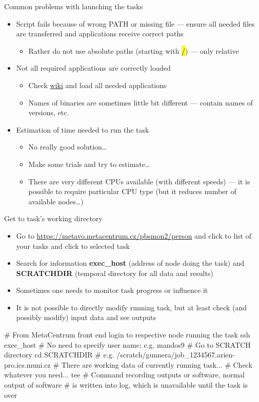 \documentclass[compress, ucs, xelatex, 11pt, xcolor=svgnames, aspectratio=169,
	hyperref={
		bookmarks=true,
		unicode=true,
		colorlinks=true,
		pdftitle={Linux, command line and MetaCentrum},
		plainpages=false,
		pdfauthor={Vojtech Zeisek},
		pdfsubject={Course about use of Linux command line, writing shell scripts and using MetaCentrum of CESNET},
		pdfcreator={XeLaTeX},
		pdfkeywords={Linux, GNU, BASH, shell, command line, MetaCentrum},
		linkcolor=DarkRed, %
		anchorcolor=DarkBlue, %
		citecolor=Indigo, %
		filecolor=NavyBlue, %
		menucolor=DarkMagenta, %
		urlcolor=DarkBlue, %
		pdftex},
	url={hyphens, lowtilde} %
	]{beamer}
\renewcommand{\texttt}[1]{\hl{\ttfamily #1}}
\begin{document}
\begin{frame}{Common problems with launching the tasks}
	\begin{itemize}
		\item Script fails because of wrong PATH or missing file --- ensure all needed files are transferred and applications receive correct paths
		\begin{itemize}
			\item Rather do not use absolute paths (starting with \texttt{/}) --- only relative
		\end{itemize}
		\item Not all required applications are correctly loaded
		\begin{itemize}
			\item Check \href{https://wiki.metacentrum.cz/wiki/Kategorie:Applications}{wiki} and load all needed applications
			\item Names of binaries are sometimes little bit different --- contain names of versions, etc.
		\end{itemize}
		\item Estimation of time needed to run the task
		\begin{itemize}
			\item No really good solution\ldots
			\item Make some trials and try to estimate\ldots
			\item There are very different CPUs available (with different speeds) --- it is possible to require particular CPU type (but it reduces number of available nodes\ldots)
		\end{itemize}
	\end{itemize}
\end{frame}

\begin{frame}[fragile]{Get to task's working directory}
	\begin{itemize}
		\item Go to \url{https://metavo.metacentrum.cz/pbsmon2/person} and click to list of your tasks and click to selected task
		\item Search for information \textbf{exec\_host} (address of node doing the task) and \textbf{SCRATCHDIR} (temporal directory for all data and results)
		\item Sometimes one needs to monitor task progress or influence it
		\item It is not possible to directly modify running task, but at least check (and possibly modify) input data and see outputs
	\end{itemize}
	\begin{bashcode}
    # From MetaCentrum front end login to respective node running the task
    ssh exec_host # No need to specify user name; e.g. mandos9
    # Go to SCRATCH directory
    cd SCRATCHDIR # e.g. /scratch/gunnera/job_1234567.arien-pro.ics.muni.cz
    # There are working data of currently running task...
    # Check whatever you need...
    tee # Command recording outputs or software, normal output of software
        # is written into log, which is unavailable until the task is over
	\end{bashcode}
\end{frame}
\end{document}
